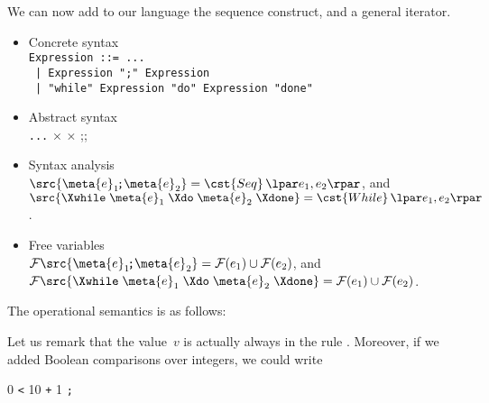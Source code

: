 We can now add to our language the sequence construct, and a general
iterator.
\begin{itemize}

  \item Concrete syntax\\
\texttt{Expression ::= ...}\\
\texttt{\hphantom{Expression} | Expression ";" Expression}\\
\texttt{\hphantom{Expression} | "while" Expression "do" Expression "done"}

  \item Abstract syntax\\
     \Xtype {} \equal \texttt{...} \vbar{} 
     \Xof {} \(\times\) 
     \vbar{}  \Xof {} \(\times\)
     \textsf{;;}{}

  \item Syntax analysis\\ $\src{\meta{e}_1\!\texttt{;} \meta{e}_2} =
    \cst{Seq} \, \lpar e_1, e_2\rpar$, and $\src{\Xwhile \; \meta{e}_1
      \; \Xdo \; \meta{e}_2 \; \Xdone} = \cst{While} \, \lpar e_1,
    e_2\rpar$.

  \item Free variables\\
    $\mathcal{F} \src{\meta{e}_1\!\texttt{;} \meta{e}_2}
    = \mathcal{F}(e_1) \cup \mathcal{F}(e_2)$, and\\
    $\mathcal{F} \src{\Xwhile \; \meta{e}_1 \; \Xdo \; \meta{e}_2 \; \Xdone}
    = \mathcal{F}(e_1) \cup \mathcal{F}(e_2)$.

\end{itemize}
The operational semantics is as follows:
Let us remark that the value~\(v\) is actually always \lpar\rpar{} in
the rule . Moreover, if we added Boolean comparisons
over integers, we could write
\begin{center}
\Xlet {} \equal \num{0} \Xin
\lpar\Xwhile {} \texttt{<} \num{10} \Xdo {} \assign {}
\texttt{+} \num{1} \Xdone \texttt{;} \rpar
\end{center}

